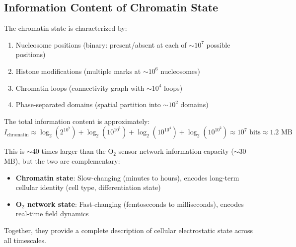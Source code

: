 \documentclass[twocolumn,10pt,aps,prd,superscriptaddress,floatfix,nofootinbib]{revtex4-2}
\theoremstyle{remark}
\begin{document}
\subsection{Information Content of Chromatin State}

The chromatin state is characterized by:
\begin{enumerate}
\item Nucleosome positions (binary: present/absent at each of $\sim 10^7$ possible positions)
\item Histone modifications (multiple marks at $\sim 10^6$ nucleosomes)
\item Chromatin loops (connectivity graph with $\sim 10^4$ loops)
\item Phase-separated domains (spatial partition into $\sim 10^2$ domains)
\end{enumerate}

The total information content is approximately:
\begin{equation}
I_{\mathrm{chromatin}} \approx \log_2(2^{10^7}) + \log_2(10^{10^6}) + \log_2(10^{10^4}) + \log_2(10^{10^2}) \approx 10^7 \text{ bits} \approx 1.2 \text{ MB}
\end{equation}

This is $\sim 40$ times larger than the O$_2$ sensor network information capacity ($\sim 30$ MB), but the two are complementary:
\begin{itemize}
\item \textbf{Chromatin state}: Slow-changing (minutes to hours), encodes long-term cellular identity (cell type, differentiation state)
\item \textbf{O$_2$ network state}: Fast-changing (femtoseconds to milliseconds), encodes real-time field dynamics
\end{itemize}

Together, they provide a complete description of cellular electrostatic state across all timescales.
\end{document}
